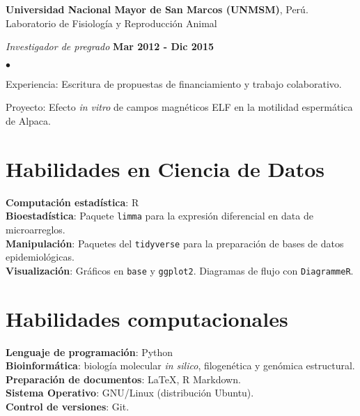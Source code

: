 \documentclass[margin,line]{res}
\newenvironment{list1}{
	\begin{list}{\ding{113}}{%
			\setlength{\itemsep}{0in}
			\setlength{\parsep}{0in} \setlength{\parskip}{0in}
			\setlength{\topsep}{0in} \setlength{\partopsep}{0in}
			\setlength{\leftmargin}{0.17in}}}{\end{list}}
\newenvironment{list2}{
	\begin{list}{$\bullet$}{%
			\setlength{\itemsep}{0in}
			\setlength{\parsep}{0in} \setlength{\parskip}{0in}
			\setlength{\topsep}{0in} \setlength{\partopsep}{0in}
			\setlength{\leftmargin}{0.2in}}}{\end{list}}
\begin{document}
\begin{resume}
		{\bf Universidad Nacional Mayor de San Marcos (UNMSM)}, Perú.\\
		Laboratorio de Fisiología y Reproducción Animal\\
		\vspace*{-.1in}
		\begin{list1}
			\item[] {\em Investigador de pregrado} \hfill {\bf Mar 2012 - Dic 2015}\\
			\vspace*{-.1in}
			\begin{list2}
				\item Experiencia: Escritura de propuestas de financiamiento y trabajo colaborativo.
				\item Proyecto: Efecto \textit{in vitro} de campos magnéticos ELF en la motilidad espermática de Alpaca.\\
			\end{list2}
		\end{list1}
		
		\section{\sc Habilidades en Ciencia de Datos}%
		{\bf Computación estadística}: R\\
		{\bf Bioestadística}: Paquete \texttt{limma} para la expresión diferencial en data de microarreglos.\\ 
		{\bf Manipulación}: Paquetes del \texttt{tidyverse} para la preparación de bases de datos epidemiológicas.\\
		{\bf Visualización}: Gráficos en \texttt{base} y \texttt{ggplot2}. Diagramas de flujo con \texttt{DiagrammeR}.\\ 	
		
		\section{\sc Habilidades computacionales}
		{\bf Lenguaje de programación}: Python\\%
		{\bf Bioinformática}: biología molecular \textit{in silico}, filogenética y genómica estructural.\\	%
		{\bf Preparación de documentos}: LaTeX, R Markdown.\\
		{\bf Sistema Operativo}: GNU/Linux (distribución Ubuntu).\\ %
		{\bf Control de versiones}: Git.\\ %
		

\end{resume}
\end{document}
